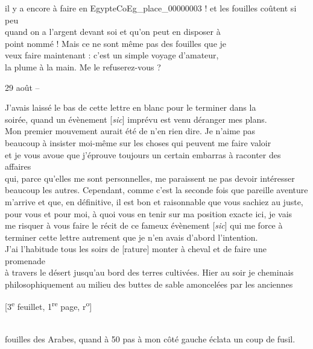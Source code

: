 \documentclass{book}
\begin{document}
il y a encore à faire en Egypte\gls{CoEg_place_00000003} ! et les fouilles coûtent si peu\\
quand on a l’argent devant soi et qu’on peut en disposer à\\
point nommé ! Mais ce ne sont même pas des fouilles que je\\
veux faire maintenant : c’est un simple voyage d’amateur,\\
la plume à la main. Me le refuserez-vous ?
{\footnotesize\begin{flushright}29 août –\end{flushright}}
\indent J’avais laissé le bas de cette lettre en blanc pour le terminer dans la\\
soirée, quand un évènement {[\textit{sic}]} imprévu est venu déranger mes plans.\\
\indent Mon premier mouvement aurait été de n’en rien dire. Je n’aime pas\\
beaucoup à insister moi-même sur les choses qui peuvent me faire valoir\\
et je vous avoue que j’éprouve toujours un certain embarras à raconter des affaires\\
qui, parce qu’elles me sont personnelles, me paraissent ne pas devoir intéresser\\
beaucoup les autres. Cependant, comme c’est la seconde fois que pareille aventure\\
m’arrive et que, en définitive, il est bon et raisonnable que vous sachiez au juste,\\
pour vous et pour moi, à quoi vous en tenir sur ma position exacte ici, je vais\\
me risquer à vous faire le récit de ce fameux évènement {[\textit{sic}]} qui me force à\\
terminer cette lettre autrement que je n’en avais d’abord l’intention.\\
\indent J’ai l’habitude tous les soirs de [rature] monter à cheval et de faire une promenade\\
à travers le désert jusqu’au bord des terres cultivées. Hier au soir je cheminais\\
philosophiquement au milieu des buttes de sable amoncelées par les anciennes
{\footnotesize\begin{center} {[3\textsuperscript{e} feuillet, 1\textsuperscript{re} page, r\textsuperscript{o}]}\end{center}}
\noindent {}\\
\noindent fouilles des Arabes, quand à 50 pas à mon côté gauche éclata un coup de fusil.\\
\end{document}
